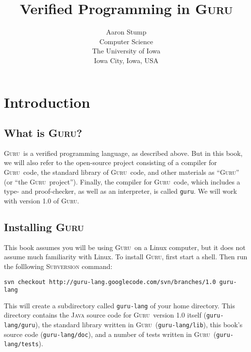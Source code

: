 \documentclass{book}[12pt]
\newcommand{\guru}[0]{\textsc{Guru}}
\begin{document}
\title{Verified Programming in \guru}

\author{Aaron Stump \\
Computer Science \\
The University of Iowa \\
Iowa City, Iowa, USA
}

\maketitle

\tableofcontents

\chapter{Introduction}
\label{ch1}

\section{What is \guru?}

\guru\ is a verified programming language, as described above.  But in
this book, we will also refer to the open-source project consisting of
a compiler for \guru\ code, the standard library of \guru\ code, and
other materials as ``\guru'' (or ``the \guru\ project'').  Finally,
the compiler for \guru\ code, which includes a type- and
proof-checker, as well as an interpreter, is called \texttt{guru}.  We
will work with version 1.0 of \guru.

\section{Installing \guru}

This book assumes you will be using \guru\ on a Linux computer, but it
does not assume much familiarity with Linux.  To install \guru, first
start a shell. Then run the folllowing \textsc{Subversion} command:

\begin{verbatim}
svn checkout http://guru-lang.googlecode.com/svn/branches/1.0 guru-lang
\end{verbatim}

\noindent This will create a subdirectory called \texttt{guru-lang} of
your home directory.  This directory contains the \textsc{Java} source
code for \guru\ version 1.0 itself (\texttt{guru-lang/guru}), the
standard library written in \guru\ (\texttt{guru-lang/lib}), this
book's source code (\texttt{guru-lang/doc}), and a number of tests
written in \guru\ (\texttt{guru-lang/tests}).
\end{document}
